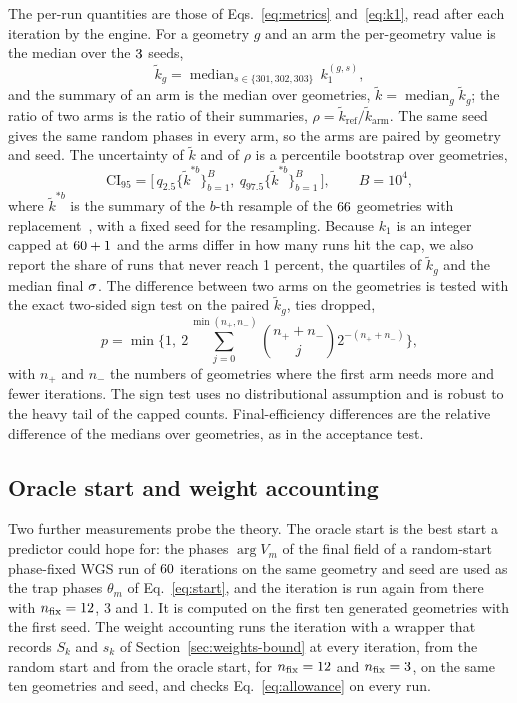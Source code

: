 The per-run quantities are those of Eqs.~\eqref{eq:metrics} and~\eqref{eq:k1}, read after each iteration by the engine. For a geometry $g$ and an arm the per-geometry value is the median over the $3$ seeds,
\begin{equation}
\tilde k_g=\operatorname{median}_{s\in\{301,302,303\}}\,k_1^{(g,s)},
\label{eq:pergeo}
\end{equation}
and the summary of an arm is the median over geometries, $\tilde k=\operatorname{median}_g\tilde k_g$; the ratio of two arms is the ratio of their summaries, $\rho=\tilde k_{\mathrm{ref}}/\tilde k_{\mathrm{arm}}$. The same seed gives the same random phases in every arm, so the arms are paired by geometry and seed. The uncertainty of $\tilde k$ and of $\rho$ is a percentile bootstrap over geometries,
\begin{equation}
\mathrm{CI}_{95}=\big[\,q_{2.5}\{\tilde k^{*b}\}_{b=1}^{B},\ q_{97.5}\{\tilde k^{*b}\}_{b=1}^{B}\,\big],\qquad B=10^{4},
\label{eq:boot}
\end{equation}
where $\tilde k^{*b}$ is the summary of the $b$-th resample of the $66$ geometries with replacement~\cite{efron}, with a fixed seed for the resampling. Because $k_1$ is an integer capped at $60+1$ and the arms differ in how many runs hit the cap, we also report the share of runs that never reach 1 percent, the quartiles of $\tilde k_g$ and the median final $\sigma$. The difference between two arms on the geometries is tested with the exact two-sided sign test on the paired $\tilde k_g$, ties dropped,
\begin{equation}
p=\min\Big\{1,\ 2\sum_{j=0}^{\min(n_+,n_-)}\binom{n_++n_-}{j}2^{-(n_++n_-)}\Big\},
\label{eq:sign}
\end{equation}
with $n_+$ and $n_-$ the numbers of geometries where the first arm needs more and fewer iterations. The sign test uses no distributional assumption and is robust to the heavy tail of the capped counts. Final-efficiency differences are the relative difference of the medians over geometries, as in the acceptance test.

\subsection{Oracle start and weight accounting}\label{sec:oracle-design}

Two further measurements probe the theory. The oracle start is the best start a predictor could hope for: the phases $\arg V_m$ of the final field of a random-start phase-fixed WGS run of $60$ iterations on the same geometry and seed are used as the trap phases $\theta_m$ of Eq.~\eqref{eq:start}, and the iteration is run again from there with $n_{\mathrm{fix}}=12$, $3$ and $1$. It is computed on the first ten generated geometries with the first seed. The weight accounting runs the iteration with a wrapper that records $S_k$ and $s_k$ of Section~\ref{sec:weights-bound} at every iteration, from the random start and from the oracle start, for $n_{\mathrm{fix}}=12$ and $n_{\mathrm{fix}}=3$, on the same ten geometries and seed, and checks Eq.~\eqref{eq:allowance} on every run.

